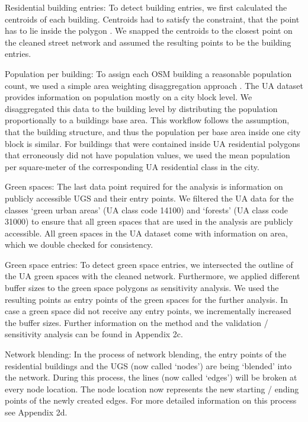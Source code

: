 \documentclass[10pt]{article}
\begin{document}
Residential building entries: To detect building entries, we first calculated the centroids of each building.  
Centroids had to satisfy the constraint, that the point has to lie inside the polygon \citep{Pebesma.2022}.
We snapped the centroids to the closest point on the cleaned street network and assumed the resulting points to be the building entries.

Population per building: To assign each OSM building a reasonable population count, we used a simple area weighting disaggregation approach \citep{Li.2007}.
The UA dataset provides information on population mostly on a city block level.
We disaggregated this data to the building level by distributing the population proportionally to a buildings base area.
This workflow follows the assumption, that the building structure, and thus the population per base area inside one city block is similar.
For buildings that were contained inside UA residential polygons that erroneously did not have population values, we used the mean population per square-meter of the corresponding UA residential class in the city.

Green spaces: The last data point required for the analysis is information on publicly accessible UGS and their entry points.
We filtered the UA data for the classes ‘green urban areas’ (UA class code 14100) and ‘forests’ (UA class code 31000) to ensure that all green spaces that are used in the analysis are publicly accessible.
All green spaces in the UA dataset come with information on area, which we double checked for consistency.

Green space entries: To detect green space entries, we intersected the outline of the UA green spaces with the cleaned network.
Furthermore, we applied different buffer sizes to the green space polygons as sensitivity analysis.
We used the resulting points as entry points of the green spaces for the further analysis.
In case a green space did not receive any entry points, we incrementally increased the buffer sizes.
Further information on the method and the validation / sensitivity analysis can be found in Appendix 2c.

Network blending: In the process of network blending, the entry points of the residential buildings and the UGS (now called ‘nodes’) are being ‘blended’ into the network.
During this process, the lines (now called ‘edges’) will be broken at every node location.
The node location now represents the new starting / ending points of the newly created edges.
For more detailed information on this process see Appendix 2d.
\end{document}

